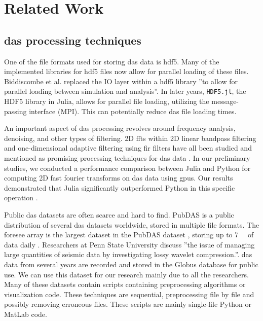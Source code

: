 \section{Related Work}
\label{back:relwork}


\subsection{\acrshort{das} processing techniques}

One of the file formats used for storing \acrshort{das} data is \acrshort{hdf5}. Many of the implemented libraries for \acrshort{hdf5} files now allow for parallel loading of these files. Biddiscombe et al. \cite{biddiscombe2012parallel} replaced the IO layer within a \acrshort{hdf5} library ''to allow for parallel loading between simulation and analysis''. In later years, \texttt{HDF5.jl}, the HDF5 library in Julia, allows for parallel file loading, utilizing the message-passing interface (MPI). This can potentially reduce \acrshort{das} file loading times.

An important aspect of \acrshort{das} processing revolves around frequency analysis, denoising, and other types of filtering. 2D \acrfull{fft}s within 2D linear bandpass filtering and one-dimensional adaptive filtering using \acrfull{fir} filters have all been studied and mentioned as promising processing techniques for \acrshort{das} data \cite{daspreproc}. In our preliminary studies, we conducted a performance comparison between Julia and Python for computing 2D fast fourier transforms on \acrshort{das} data using \acrshort{gpu}s. Our results demonstrated that Julia significantly outperformed Python in this specific operation \cite{projthesis}. 

Public \acrshort{das} datasets are often scarce and hard to find. PubDAS \cite{spica2023pubdas} is a public distribution of several \acrshort{das} datasets worldwide, stored in multiple file formats. The \acrfull{foresee} \cite{se-12-219-2021, zhu2023seismic, shen2021seismic, thunderddas, hone2021seismic, zhu2019penn} array is the largest dataset in the PubDAS dataset \cite{spica2023pubdas}, storing up to \qty{7}{\si{\tera\byte}} of data daily \cite{miller2023characterizing}. Researchers at Penn State University discuss ''the issue of managing large quantities of seismic data by investigating lossy wavelet compression.''. \acrshort{das} data from several years are recorded and stored in the Globus database for public use. We can use this dataset for our research mainly due to all the researchers. Many of these datasets contain scripts containing preprocessing algorithms or visualization code. These techniques are sequential, preprocessing file by file and possibly removing erroneous files. These scripts are mainly single-file Python or MatLab code. 

